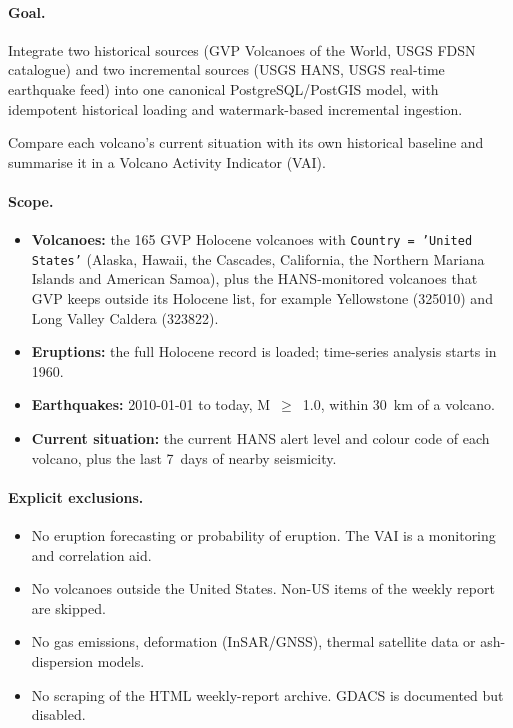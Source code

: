 \documentclass[11pt,a4paper]{article}
\begin{document}
\paragraph{Goal.}
\begin{description}[style=nextline,leftmargin=0.5cm]
  \item[Data-engineering perspective] Integrate two historical sources (GVP Volcanoes
  of the World, USGS FDSN catalogue) and two incremental sources (USGS HANS, USGS
  real-time earthquake feed) into one canonical PostgreSQL/PostGIS model, with
  idempotent historical loading and watermark-based incremental ingestion.
  \item[Analytical perspective] Compare each volcano's current situation with its own
  historical baseline and summarise it in a Volcano Activity Indicator (VAI).
\end{description}

\paragraph{Scope.}
\begin{itemize}
  \item \textbf{Volcanoes:} the 165 GVP Holocene volcanoes with
  \texttt{Country = 'United States'} (Alaska, Hawaii, the Cascades, California, the
  Northern Mariana Islands and American Samoa), plus the HANS-monitored volcanoes that
  GVP keeps outside its Holocene list, for example Yellowstone (325010) and Long Valley
  Caldera (323822).
  \item \textbf{Eruptions:} the full Holocene record is loaded; time-series analysis
  starts in 1960.
  \item \textbf{Earthquakes:} 2010-01-01 to today, M~$\geq$~1.0, within 30~km of a
  volcano.
  \item \textbf{Current situation:} the current HANS alert level and colour code of
  each volcano, plus the last 7~days of nearby seismicity.
\end{itemize}

\paragraph{Explicit exclusions.}
\begin{itemize}
  \item No eruption forecasting or probability of eruption. The VAI is a monitoring and
  correlation aid.
  \item No volcanoes outside the United States. Non-US items of the weekly report are
  skipped.
  \item No gas emissions, deformation (InSAR/GNSS), thermal satellite data or
  ash-dispersion models.
  \item No scraping of the HTML weekly-report archive. GDACS is documented but
  disabled.
\end{itemize}
\end{document}
